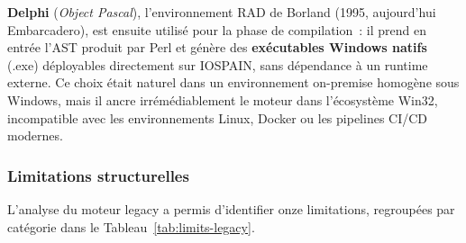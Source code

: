 \textbf{Delphi} (\textit{Object Pascal}), l'environnement RAD de Borland (1995, aujourd'hui Embarcadero), est ensuite utilisé pour la phase de compilation~: il prend en entrée l'AST produit par Perl et génère des \textbf{exécutables Windows natifs} (.exe) déployables directement sur IOSPAIN, sans dépendance à un runtime externe. Ce choix était naturel dans un environnement on-premise homogène sous Windows, mais il ancre irrémédiablement le moteur dans l'écosystème Win32, incompatible avec les environnements Linux, Docker ou les pipelines CI/CD modernes.

\subsubsection*{Limitations structurelles}

L'analyse du moteur legacy a permis d'identifier onze limitations, regroupées par catégorie dans le Tableau~\ref{tab:limits-legacy}.

